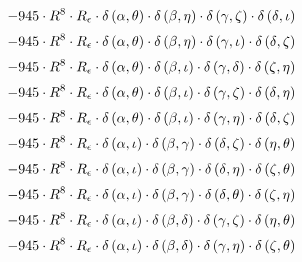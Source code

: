 \begin{subequations}
\begin{gather}
 \\[0.2em] \notag 		 - 945 \cdot R^{8} \cdot R_{\epsilon{}} \cdot \delta{}\left(\alpha{}, \theta{}\right) \cdot \delta{}\left(\beta{}, \eta{}\right) \cdot \delta{}\left(\gamma{}, \zeta{}\right) \cdot \delta{}\left(\delta{}, \iota{}\right) 
 \\[0.2em] \notag 		 - 945 \cdot R^{8} \cdot R_{\epsilon{}} \cdot \delta{}\left(\alpha{}, \theta{}\right) \cdot \delta{}\left(\beta{}, \eta{}\right) \cdot \delta{}\left(\gamma{}, \iota{}\right) \cdot \delta{}\left(\delta{}, \zeta{}\right) 
 \\[0.2em] \notag 		 - 945 \cdot R^{8} \cdot R_{\epsilon{}} \cdot \delta{}\left(\alpha{}, \theta{}\right) \cdot \delta{}\left(\beta{}, \iota{}\right) \cdot \delta{}\left(\gamma{}, \delta{}\right) \cdot \delta{}\left(\zeta{}, \eta{}\right) 
 \\[0.2em] \notag 		 - 945 \cdot R^{8} \cdot R_{\epsilon{}} \cdot \delta{}\left(\alpha{}, \theta{}\right) \cdot \delta{}\left(\beta{}, \iota{}\right) \cdot \delta{}\left(\gamma{}, \zeta{}\right) \cdot \delta{}\left(\delta{}, \eta{}\right) 
 \\[0.2em] \notag 		 - 945 \cdot R^{8} \cdot R_{\epsilon{}} \cdot \delta{}\left(\alpha{}, \theta{}\right) \cdot \delta{}\left(\beta{}, \iota{}\right) \cdot \delta{}\left(\gamma{}, \eta{}\right) \cdot \delta{}\left(\delta{}, \zeta{}\right) 
 \\[0.2em] \notag 		 - 945 \cdot R^{8} \cdot R_{\epsilon{}} \cdot \delta{}\left(\alpha{}, \iota{}\right) \cdot \delta{}\left(\beta{}, \gamma{}\right) \cdot \delta{}\left(\delta{}, \zeta{}\right) \cdot \delta{}\left(\eta{}, \theta{}\right) 
 \\[0.2em] \notag 		 - 945 \cdot R^{8} \cdot R_{\epsilon{}} \cdot \delta{}\left(\alpha{}, \iota{}\right) \cdot \delta{}\left(\beta{}, \gamma{}\right) \cdot \delta{}\left(\delta{}, \eta{}\right) \cdot \delta{}\left(\zeta{}, \theta{}\right) 
 \\[0.2em] \notag 		 - 945 \cdot R^{8} \cdot R_{\epsilon{}} \cdot \delta{}\left(\alpha{}, \iota{}\right) \cdot \delta{}\left(\beta{}, \gamma{}\right) \cdot \delta{}\left(\delta{}, \theta{}\right) \cdot \delta{}\left(\zeta{}, \eta{}\right) 
 \\[0.2em] \notag 		 - 945 \cdot R^{8} \cdot R_{\epsilon{}} \cdot \delta{}\left(\alpha{}, \iota{}\right) \cdot \delta{}\left(\beta{}, \delta{}\right) \cdot \delta{}\left(\gamma{}, \zeta{}\right) \cdot \delta{}\left(\eta{}, \theta{}\right) 
 \\[0.2em] \notag 		 - 945 \cdot R^{8} \cdot R_{\epsilon{}} \cdot \delta{}\left(\alpha{}, \iota{}\right) \cdot \delta{}\left(\beta{}, \delta{}\right) \cdot \delta{}\left(\gamma{}, \eta{}\right) \cdot \delta{}\left(\zeta{}, \theta{}\right) 

\end{gather}
\end{subequations}

